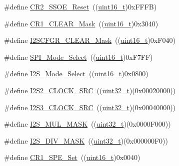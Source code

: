 \begin{DoxyCompactItemize}
\item 
\#define \hyperlink{group___s_p_i___private___defines_ga475caaaef8732d35e4c6fd3f21dc4e3c}{C\+R2\+\_\+\+S\+S\+O\+E\+\_\+\+Reset}~((\hyperlink{_p_e___types_8h_a1f1825b69244eb3ad2c7165ddc99c956}{uint16\+\_\+t})0x\+F\+F\+F\+B)
\item 
\#define \hyperlink{group___s_p_i___private___defines_ga67f7dd35ea3d1296677e5fc50b88fa90}{C\+R1\+\_\+\+C\+L\+E\+A\+R\+\_\+\+Mask}~((\hyperlink{_p_e___types_8h_a1f1825b69244eb3ad2c7165ddc99c956}{uint16\+\_\+t})0x3040)
\item 
\#define \hyperlink{group___s_p_i___private___defines_ga6cd1ac4e83d8de8e32a407d1a7971389}{I2\+S\+C\+F\+G\+R\+\_\+\+C\+L\+E\+A\+R\+\_\+\+Mask}~((\hyperlink{_p_e___types_8h_a1f1825b69244eb3ad2c7165ddc99c956}{uint16\+\_\+t})0x\+F040)
\item 
\#define \hyperlink{group___s_p_i___private___defines_ga71da9dd90bf7bfb6ed1748a1e181677a}{S\+P\+I\+\_\+\+Mode\+\_\+\+Select}~((\hyperlink{_p_e___types_8h_a1f1825b69244eb3ad2c7165ddc99c956}{uint16\+\_\+t})0x\+F7\+F\+F)
\item 
\#define \hyperlink{group___s_p_i___private___defines_ga196b1b58421a7ee7dba0b46fb33c621b}{I2\+S\+\_\+\+Mode\+\_\+\+Select}~((\hyperlink{_p_e___types_8h_a1f1825b69244eb3ad2c7165ddc99c956}{uint16\+\_\+t})0x0800)
\item 
\#define \hyperlink{group___s_p_i___private___defines_gae1190efd6dbcd06a9c03f4d499d28e4c}{I2\+S2\+\_\+\+C\+L\+O\+C\+K\+\_\+\+S\+RC}~((\hyperlink{_p_e___types_8h_a33594304e786b158f3fb30289278f5af}{uint32\+\_\+t})(0x00020000))
\item 
\#define \hyperlink{group___s_p_i___private___defines_gabb67971448c15090f3372e3875db3d23}{I2\+S3\+\_\+\+C\+L\+O\+C\+K\+\_\+\+S\+RC}~((\hyperlink{_p_e___types_8h_a33594304e786b158f3fb30289278f5af}{uint32\+\_\+t})(0x00040000))
\item 
\#define \hyperlink{group___s_p_i___private___defines_gaf9cca755995c8e8f7a4012709ca468f2}{I2\+S\+\_\+\+M\+U\+L\+\_\+\+M\+A\+SK}~((\hyperlink{_p_e___types_8h_a33594304e786b158f3fb30289278f5af}{uint32\+\_\+t})(0x0000\+F000))
\item 
\#define \hyperlink{group___s_p_i___private___defines_ga26cdb43c45ac655c792c5af0a6bbb0bf}{I2\+S\+\_\+\+D\+I\+V\+\_\+\+M\+A\+SK}~((\hyperlink{_p_e___types_8h_a33594304e786b158f3fb30289278f5af}{uint32\+\_\+t})(0x000000\+F0))
\item 
\#define \hyperlink{group___s_p_i___private___defines_ga74286f403309d32b56fed10aba2ebf91}{C\+R1\+\_\+\+S\+P\+E\+\_\+\+Set}~((\hyperlink{_p_e___types_8h_a1f1825b69244eb3ad2c7165ddc99c956}{uint16\+\_\+t})0x0040)

\end{DoxyCompactItemize}
